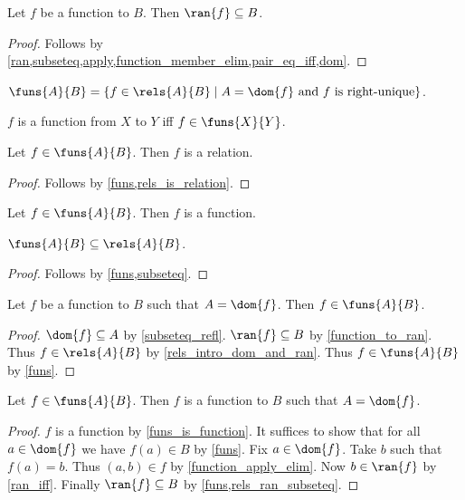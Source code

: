 \begin{proposition}\label{function_to_ran}
    Let $f$ be a function to $B$.
    Then $\ran{f}\subseteq B$.
\end{proposition}
\begin{proof}
    Follows by \cref{ran,subseteq,apply,function_member_elim,pair_eq_iff,dom}.
\end{proof}

\begin{definition}\label{funs}
    $\funs{A}{B} = \{ f\in\rels{A}{B}\mid \text{$A= \dom{f}$ and $f$ is right-unique}\}$.
\end{definition}

\begin{abbreviation}\label{function_from_to}
    $f$ is a function from $X$ to $Y$ iff $f\in\funs{X}{Y}$.
\end{abbreviation}

\begin{proposition}\label{funs_is_relation}
    Let $f\in\funs{A}{B}$.
    Then $f$ is a relation.
\end{proposition}
\begin{proof}
    Follows by \cref{funs,rels_is_relation}.
\end{proof}

\begin{proposition}\label{funs_is_function}
    Let $f\in\funs{A}{B}$.
    Then $f$ is a function.
\end{proposition}

\begin{proposition}\label{funs_subseteq_rels}
    $\funs{A}{B}\subseteq\rels{A}{B}$.
\end{proposition}
\begin{proof}
    Follows by \cref{funs,subseteq}.
\end{proof}

\begin{proposition}\label{funs_intro}
    Let $f$ be a function to $B$ such that $A=\dom{f}$.
    Then $f\in\funs{A}{B}$.
\end{proposition}
\begin{proof}
    $\dom{f}\subseteq A$ by \cref{subseteq_refl}.
    $\ran{f}\subseteq B$ by \cref{function_to_ran}.
    Thus $f\in\rels{A}{B}$ by \cref{rels_intro_dom_and_ran}.
    Thus $f\in\funs{A}{B}$ by \cref{funs}.
\end{proof}

\begin{proposition}\label{funs_elim}
    Let $f\in\funs{A}{B}$.
    Then $f$ is a function to $B$ such that $A= \dom{f}$.
\end{proposition}
\begin{proof}
    $f$ is a function by \cref{funs_is_function}. %
    It suffices to show that for all $a\in\dom{f}$ we have $f(a)\in B$ by \cref{funs}.
    Fix $a\in\dom{f}$.
    Take $b$ such that $f(a) = b$.
    Thus $(a,b)\in f$ by \cref{function_apply_elim}.
    Now $b\in\ran{f}$ by \cref{ran_iff}.
    Finally $\ran{f}\subseteq B$ by \cref{funs,rels_ran_subseteq}.
\end{proof}

